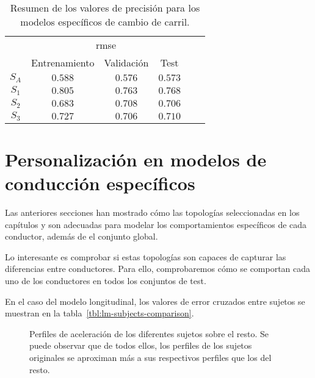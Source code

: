 \begin{table}
	\centering
	\caption[Precisión alcanzada para los modelos específicos de cambio de carril]{Resumen de los valores de precisión para los modelos específicos de cambio de carril.}
	\label{tbl:lc-specific-accuracy}
	\begin{tabular}{cccccc}
		\toprule
		\multirow{2}{*}{} & \multicolumn{3}{c}{\ac{rmse}}      \\ 
		& Entrenamiento & Validación & Test \\
		\midrule
		\rowcolor{black!20} $S_A$ & $0.588$ & $0.576$ & $0.573$  \\
		$S_1$ & $0.805$ & $0.763$ & $0.768$  \\
		\rowcolor{black!20} $S_2$ & $0.683$ & $0.708$ & $0.706$  \\
		$S_3$ & $0.727$ & $0.706$ & $0.710$  \\
		\bottomrule
	\end{tabular}
\end{table}


\section{Personalización en modelos de conducción específicos}

Las anteriores secciones han mostrado cómo las topologías seleccionadas en los capítulos  y  son adecuadas para modelar los comportamientos específicos de cada conductor, además de el conjunto global.

Lo interesante es comprobar si estas topologías son capaces de capturar las diferencias entre conductores. Para ello, comprobaremos cómo se comportan cada uno de los conductores en todos los conjuntos de test.

En el caso del modelo longitudinal, los valores de error cruzados entre sujetos se muestran en la tabla~\ref{tbl:lm-subjects-comparison}.

\begin{figure}[t]
	\centering
	\qquad
	\qquad
	\caption[Diferencia entre los perfiles de aceleración para los diferentes sujetos]{Perfiles de aceleración de los diferentes sujetos sobre el resto. Se puede observar que de todos ellos, los perfiles de los sujetos originales se aproximan más a sus respectivos perfiles que los del resto.}
	\label{fig:lm-subjects-comparison}
\end{figure}


